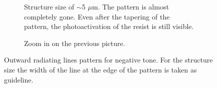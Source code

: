 \begin{figure}[htb]
\begin{subfigure}[t]{0.24\linewidth}
  	\label{fig:b2d23_q23}
  \end{subfigure}
 \hfill
     \begin{subfigure}[t]{0.24\linewidth}
  	\centering
  	\caption{Structure size of $\sim$5 $\mu$m. The pattern is almost completely gone. Even after the tapering of the pattern, the photoactivation of the resist is still visible.}
  	\label{fig:b2d24_q24}
  \end{subfigure}
\hfill
     \begin{subfigure}[t]{0.24\linewidth}
  	\caption{Zoom in on the previous picture.}
  	\label{fig:b2d25_q25}
  \end{subfigure}
 \hfill
\caption{Outward radiating lines pattern for negative tone. For the structure size the width of the line at the edge of the pattern is taken as guideline.}
 \end{figure}

